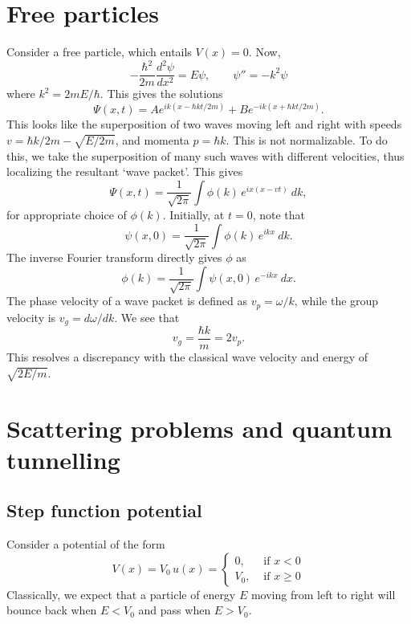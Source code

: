 \documentclass[11pt]{article}
\newcommand\dd[3][]{\frac{d^{#1}{#2}}{d {#3}^{#1}}}
\theoremstyle{definition}
\theoremstyle{remark}
\numberwithin{equation}{section}
\begin{document}
    \section{Free particles}
    Consider a free particle, which entails $V(x) = 0$. Now, \[
        -\frac{\hbar^2}{2m}\dd[2]{\psi}{x} = E \psi, \qquad 
        \psi'' = -k^2\psi
    \] where $k^2 = 2mE / \hbar$. This gives the solutions \[
        \Psi(x, t) = Ae^{ik(x - \hbar kt / 2m)} + Be^{-ik(x + \hbar kt / 2m)}.
    \] This looks like the superposition of two waves moving left and right with
    speeds $v = \hbar k / 2m - \sqrt{E / 2m}$, and momenta $p = \hbar k$.
    This is not normalizable. To do this, we take the superposition of many such
    waves with different velocities, thus localizing the resultant `wave packet'.
    This gives \[
        \Psi(x, t) = \frac{1}{\sqrt{2\pi}} \int \phi(k)\, e^{ix(x - vt)}\:dk,
    \] for appropriate choice of $\phi(k)$. Initially, at $t = 0$, note that \[
        \psi(x, 0) = \frac{1}{\sqrt{2\pi}} \int \phi(k)\, e^{ikx}\:dk.
    \] The inverse Fourier transform directly gives $\phi$ as \[
        \phi(k) = \frac{1}{\sqrt{2\pi}} \int \psi(x, 0)\, e^{-ikx}\:dx.
    \] The phase velocity of a wave packet is defined as $v_p =\omega /k$, while the
    group velocity is $v_g = d\omega / dk$. We see that \[
        v_g = \frac{\hbar k}{m} = 2v_p.
    \] This resolves a discrepancy with the classical wave velocity and energy of
    $\sqrt{2E / m}$.

    \section{Scattering problems and quantum tunnelling}
    \subsection{Step function potential}
    Consider a potential of the form \[
        V(x) = V_0\, u(x) = \begin{cases}
            0, &\text{ if }x < 0 \\
            V_0, &\text{ if } x \geq 0
        \end{cases}
    \] Classically, we expect that a particle of energy $E$ moving from left to
    right will bounce back when $E < V_0$ and pass when $E > V_0$. 
\end{document}
